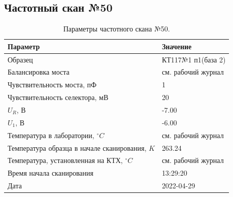 \subsection{Частотный скан №50}
\begin{table}[!ht]
    \centering
    \caption{Параметры частотного скана №50.}
    \begin{tabular}{|l|l|}
        \hline
        Параметр                                       & Значение                  \\ \hline
        Образец                                        & КТ117№1 п1(база 2)        \\ \hline
        Балансировка моста                             & см. рабочий журнал        \\ \hline
        Чувствительность моста, пФ                     & 1                         \\ \hline
        Чувствительность селектора, мВ                 & 20                        \\ \hline
        $U_R$, В                                       & -7.00                     \\ \hline
        $U_1$, В                                       & -6.00                     \\ \hline
        Температура в лаборатории, $^\circ C$          & см. рабочий журнал        \\ \hline
        Температура образца в начале сканирования, $K$ & 263.24                    \\ \hline
        Температура, установленная на КТХ, $^\circ C$  & см. рабочий журнал        \\ \hline
        Время начала сканирования                      & 13:29:20                  \\ \hline
        Дата                                           & 2022-04-29                \\ \hline
    \end{tabular}
    \label{table:frequency_scan_50}
\end{table}

